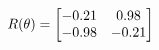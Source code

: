 \documentclass[preview]{standalone}
\begin{document}
\begin{align*}
\special{dvisvgm:raw <g id='unique000'>}R(\theta) = \begin{bmatrix}-0.21 & 0.98\\-0.98 & -0.21\end{bmatrix}\special{dvisvgm:raw </g>}
\end{align*}
\end{document}
